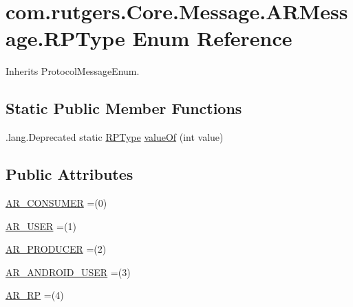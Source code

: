 \hypertarget{enumcom_1_1rutgers_1_1Core_1_1Message_1_1ARMessage_1_1RPType}{}\section{com.\+rutgers.\+Core.\+Message.\+A\+R\+Message.\+R\+P\+Type Enum Reference}
\label{enumcom_1_1rutgers_1_1Core_1_1Message_1_1ARMessage_1_1RPType}


Inherits Protocol\+Message\+Enum.

\subsection*{Static Public Member Functions}
\begin{DoxyCompactItemize}
\item 
.lang.\+Deprecated static \hyperlink{enumcom_1_1rutgers_1_1Core_1_1Message_1_1ARMessage_1_1RPType}{R\+P\+Type} \hyperlink{enumcom_1_1rutgers_1_1Core_1_1Message_1_1ARMessage_1_1RPType_aa300501b5400695678c229e3d7f6eff3}{value\+Of} (int value)
\end{DoxyCompactItemize}
\subsection*{Public Attributes}
\begin{DoxyCompactItemize}
\item 
\hyperlink{enumcom_1_1rutgers_1_1Core_1_1Message_1_1ARMessage_1_1RPType_a5ad2d7bf858b18aa8bd99453e42d758c}{A\+R\+\_\+\+C\+O\+N\+S\+U\+M\+ER} =(0)
\item 
\hyperlink{enumcom_1_1rutgers_1_1Core_1_1Message_1_1ARMessage_1_1RPType_a7bc13bd5f7ee4ba265c00bb2a26cf74c}{A\+R\+\_\+\+U\+S\+ER} =(1)
\item 
\hyperlink{enumcom_1_1rutgers_1_1Core_1_1Message_1_1ARMessage_1_1RPType_adad71551f5fbf1c673d2bcfac5326877}{A\+R\+\_\+\+P\+R\+O\+D\+U\+C\+ER} =(2)
\item 
\hyperlink{enumcom_1_1rutgers_1_1Core_1_1Message_1_1ARMessage_1_1RPType_ac74adfe3c76ba0a99000b58fea4ce2b3}{A\+R\+\_\+\+A\+N\+D\+R\+O\+I\+D\+\_\+\+U\+S\+ER} =(3)
\item 
\hyperlink{enumcom_1_1rutgers_1_1Core_1_1Message_1_1ARMessage_1_1RPType_ada9191863da74aeb152ad649cba38b1b}{A\+R\+\_\+\+RP} =(4)
\end{DoxyCompactItemize}
